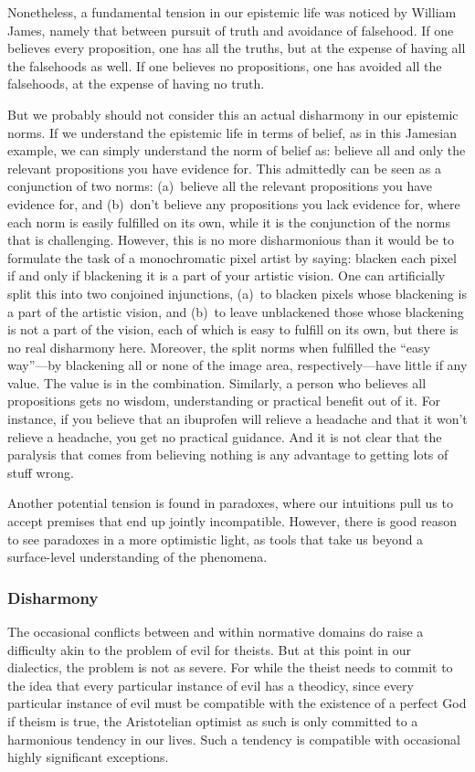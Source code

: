 Nonetheless, a fundamental tension in our epistemic life was noticed by William James, namely that between pursuit of truth and 
avoidance of falsehood. If one believes every proposition, one has all the truths, but at the expense of having 
all the falsehoods as well. If one believes no propositions, one has avoided all the falsehoods, at the expense of 
having no truth. 

But we probably should not consider this an actual disharmony in our epistemic norms. If we understand the epistemic
life in terms of belief, as in this Jamesian example, we can simply understand the norm of belief as: believe 
all and only the relevant propositions you have evidence for. This admittedly can be seen as a conjunction of 
two norms: (a)~believe all the relevant propositions you have evidence for, and (b)~don't believe any propositions 
you lack evidence for, where each norm is easily fulfilled on its own, while it is the conjunction of the norms that 
is challenging. However, this is no more disharmonious than it would be to formulate the task of a monochromatic pixel
artist by saying: blacken each pixel if and only if blackening it is a part of your artistic vision. One can artificially
split this into two conjoined injunctions, (a)~to blacken pixels whose blackening is a part of the artistic vision, and (b)~to 
leave unblackened those whose blackening is not a part of the vision, each of which is easy to fulfill on its own, but there
is no real disharmony here. Moreover, the split norms when fulfilled the ``easy way''---by blackening all or none of the 
image area, respectively---have little if any value. The value is in the combination. Similarly, a person who believes 
all propositions gets no wisdom, understanding or practical benefit out of it. For instance, if you believe that an ibuprofen 
will relieve a headache and that it won't relieve a headache, you get no practical guidance. And it is not clear that 
the paralysis that comes from believing nothing is any advantage to getting lots of stuff wrong.

Another potential tension is found in paradoxes, where our intuitions pull us to accept premises that end up jointly 
incompatible. However, there is good reason to see paradoxes in a more optimistic light, as tools that take us beyond
a surface-level understanding of the phenomena. 

\subsubsection{Disharmony}
The occasional conflicts between and within normative domains do raise a difficulty akin to the problem of evil for theists.
But at this point in our dialectics, the problem is not as severe. For while the theist needs to commit to the idea that 
every particular instance of evil has a theodicy, since every particular instance of evil must be compatible with the existence
of a perfect God if theism is true, the Aristotelian optimist as such is only committed to a harmonious tendency in our 
lives. Such a tendency is compatible with occasional highly significant exceptions.

